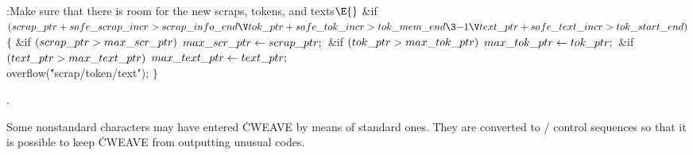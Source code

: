 \B{}:Make sure that there is room for the new scraps, tokens, and
texts\X${}\E{}$\6
\&{if} ${}(\\{scrap\_ptr}+\\{safe\_scrap\_incr}>\\{scrap\_info\_end}\V\\{tok%
\_ptr}+\\{safe\_tok\_incr}>\\{tok\_mem\_end}\3{-1}\V\\{text\_ptr}+\\{safe\_text%
\_incr}>\\{tok\_start\_end}){}$\5
${}\{{}$\1\6
\&{if} ${}(\\{scrap\_ptr}>\\{max\_scr\_ptr}){}$\1\5
${}\\{max\_scr\_ptr}\leftarrow\\{scrap\_ptr};{}$\2\6
\&{if} ${}(\\{tok\_ptr}>\\{max\_tok\_ptr}){}$\1\5
${}\\{max\_tok\_ptr}\leftarrow\\{tok\_ptr};{}$\2\6
\&{if} ${}(\\{text\_ptr}>\\{max\_text\_ptr}){}$\1\5
${}\\{max\_text\_ptr}\leftarrow\\{text\_ptr};{}$\2\6
\\{overflow}(\.{"scrap/token/text"});\6
\4${}\}{}$\2\par
{}.\fi

Some nonstandard characters may have entered \.{CWEAVE} by means of
standard ones. They are converted to \TEX/ control sequences so that it is
possible to keep \.{CWEAVE} from outputting unusual  codes.

